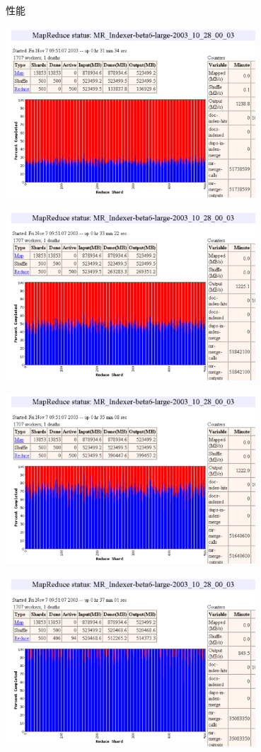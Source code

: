 \documentclass{beamer}
\begin{document}
\begin{frame}{性能}
\begin{overprint}
    \centerline{\includegraphics[height=180pt]{keyan/p5.png} }
    \centerline{\includegraphics[height=180pt]{keyan/p6.png} }
    \centerline{\includegraphics[height=180pt]{keyan/p7.png} }
    \centerline{\includegraphics[height=180pt]{keyan/p8.png} }

\end{overprint}
\end{frame}
\end{document}
